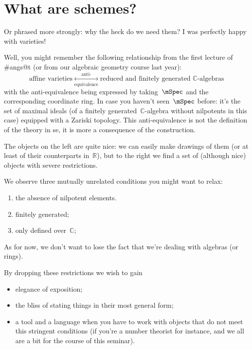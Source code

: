 \section{What are schemes?}

Or phrased more strongly: why the heck do we need them? I was perfectly happy with varieties!

Well, you might remember the following relationship from the first lecture of \#angs@t (or from our algebraic geometry course last year):
\begin{equation}
  \text{affine varieties} \underset{\text{equivalence}}{\overset{\text{anti-}}{\longleftrightarrow}} \text{reduced and finitely generated $\mathbb{C}$-algebras}
  \label{equation:variety-anti-equivalence}
\end{equation}
with the anti-equivalence being expressed by taking~$\mSpec$ and the corresponding coordinate ring. In case you haven't seen~$\mSpec$ before: it's the set of maximal ideals (of a finitely generated~$\mathbb{C}$-algebra without nilpotents in this case) equipped with a Zariski topology. This anti-equivalence is not the definition of the theory in se, it is more a consequence of the construction.

The objects on the left are quite nice: we can easily make drawings of them (or at least of their counterparts in~$\mathbb{R}$), but to the right we find a set of (although nice) objects with severe restrictions.

We observe three mutually unrelated conditions you might want to relax:
\begin{enumerate}
  \item the absence of nilpotent elements.
  \item finitely generated;
  \item only defined over~$\mathbb{C}$;
\end{enumerate}
As for now, we don't want to lose the fact that we're dealing with algebras (or rings).

By dropping these restrictions we wish to gain
\begin{itemize}
  \item elegance of exposition;
  \item the bliss of stating things in their most general form;
  \item a tool and a language when you have to work with objects that do not meet this stringent conditions (if you're a number theorist for instance, and we all are a bit for the course of this seminar).
\end{itemize}

